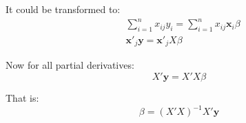 \documentclass{article}
\begin{document}
It could be transformed to:
\begin{equation}
\begin{split}
&\sum_{i=1}^nx_{ij}y_i=\sum_{i=1}^nx_{ij}\mathbf{x}_i\beta\\
&\mathbf{x}'_j\mathbf{y}=\mathbf{x}'_jX\beta
\end{split}
\end{equation}

Now for all partial derivatives:
\begin{equation}
X'\mathbf{y}=X'X\beta
\end{equation}

That is:
\begin{equation}
\beta=(X'X)^{-1}X'\mathbf{y}
\end{equation}
\end{document}
